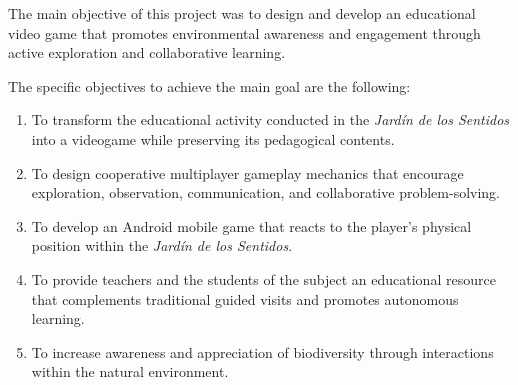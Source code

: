 The main objective of this project was to design and develop an educational video game that promotes environmental awareness and engagement through active exploration and collaborative learning.

The specific objectives to achieve the main goal are the following:
\begin{enumerate}
    \item To transform the educational activity conducted in the \textit{Jardín de los Sentidos} into a videogame while preserving its pedagogical contents.
    \item To design cooperative multiplayer gameplay mechanics that encourage exploration, observation, communication, and collaborative problem-solving.
    \item To develop an Android mobile game that reacts to the player's physical position within the \textit{Jardín de los Sentidos}.
    \item To provide teachers and the students of the subject an educational resource that complements traditional guided visits and promotes autonomous learning.
    \item To increase awareness and appreciation of biodiversity through interactions within the natural environment.
\end{enumerate}

